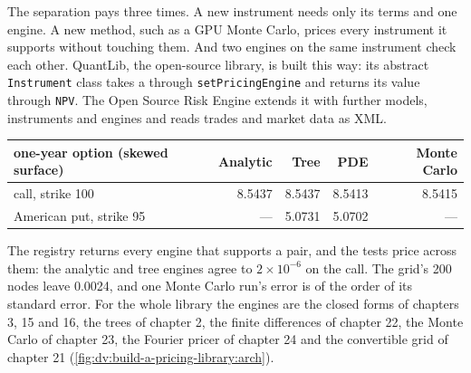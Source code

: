 The separation pays three times. A new instrument needs only its terms and one engine. A new method, such as a GPU Monte Carlo, prices every instrument
it supports without touching them. And two engines on the same instrument check each other. QuantLib, the open-source library, is built this way: its
abstract \texttt{Instrument} class takes a  through \texttt{setPricingEngine} and returns its value through \texttt{NPV}. The Open Source
Risk Engine extends it with further models, instruments and engines and reads trades and market data as XML.

\begin{center}\small
\begin{tabular}{lrrrr}
\toprule
one-year option (skewed surface) & Analytic & Tree & PDE & Monte Carlo\\
\midrule
call, strike 100 & 8.5437 & 8.5437 & 8.5413 & 8.5415\\
American put, strike 95 & --- & 5.0731 & 5.0702 & ---\\
\bottomrule
\end{tabular}
\end{center}

The registry returns every engine that supports a pair, and the tests price across them: the analytic and tree engines agree to $2\times10^{-6}$ on the
call. The grid's 200 nodes leave 0.0024, and one Monte Carlo run's error is of the order of its standard error. For the whole library the engines are the
closed forms of chapters 3, 15 and 16, the trees of chapter 2, the finite differences of chapter 22, the Monte Carlo of chapter 23, the Fourier pricer of
chapter 24 and the convertible grid of chapter 21 (\cref{fig:dv:build-a-pricing-library:arch}).

